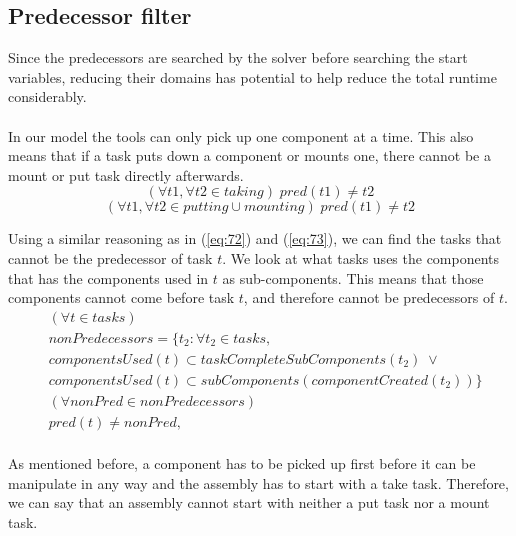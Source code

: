   
  
  \subsection{Predecessor filter}
  Since the predecessors are searched by the solver before searching the start variables, reducing their domains has potential to help reduce the total runtime considerably.
 \\\\
  In our model the tools can only pick up one component at a time. This also means that if a task puts down a component or mounts one, there cannot be a mount or put task directly afterwards.
  \begin{equation}\label{eq:75}
  (\forall t1, \forall t2 \in taking) \; pred(t1) \neq t2
  \end{equation}
  \begin{equation}\label{eq:76}
  (\forall t1, \forall t2 \in putting \cup mounting) \; pred(t1) \neq t2
  \end{equation}

   \noindent Using a similar reasoning as in (\ref{eq:72}) and (\ref{eq:73}), we can find the tasks that cannot be the predecessor of task $t$. We look at what tasks uses the components that has the components used in $t$ as sub-components. This means that those components cannot come before task $t$, and therefore cannot be predecessors of $t$.
  \begin{equation}
  \begin{aligned}\label{eq:78}
  &(\forall t \in tasks)\\
  &nonPredecessors = \{t_2 : \forall t_2 \in tasks, \\
  &componentsUsed(t) \subset taskCompleteSubComponents(t_2) \; \lor \\
  &componentsUsed(t) \subset subComponents(componentCreated(t_2))\} \\
  &(\forall nonPred \in nonPredecessors) \\
  &pred(t) \neq nonPred, \\
  \end{aligned}
  \end{equation}

   \noindent As mentioned before, a component has to be picked up first before it can be manipulate in any way and the assembly has to start with a take task. Therefore, we can say that an assembly cannot start with neither a put task nor a mount task.
    
